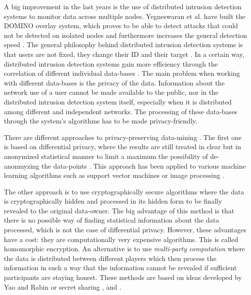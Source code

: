 A big improvement in the last years is the use of distributed intrusion detection systems to monitor data across multiple nodes. Yegneswaran et al. have built the DOMINO overlay system, which proves to be able to detect attacks that could not be detected on isolated nodes and furthermore increases the general detection speed \cite{Yegneswaran2004GlobalSystem}. The general philosophy behind distributed intrusion detection systems is that users are not fixed, they change their ID and their target \cite{Snapp1991DIDSPrototype}. In a certain way, distributed intrusion detection systems gain more efficiency through the correlation of different individual data-bases \cite{RoyceRobbins2004DistributedReview}. The main problem when working with different data-bases is the privacy of the data. Information about the network use of a user cannot be made available to the public, nor in the distributed intrusion detection system itself, especially when it is distributed among different and independent networks. The processing of these data-bases through the system's algorithms has to be made privacy-friendly.

There are different approaches to privacy-preserving data-mining \cite{Narwaria2016PrivacyArt}. The first one is based on differential privacy, where the results are still treated in clear but in anonymized statistical manner to limit a maximum the possibility of de-anonmyzing the data-points \cite{Dwork2008DifferentialResults}. This approach has been applied to various machine learning algorithms such as support vector machines or image processing \cite{Qin2018Privacy-PreservingCloud,Zhan2005Privacy-preservingLearning}.

The other approach is to use cryptographically secure algorithms where the data is cryptographically hidden and processed in its hidden form to be finally revealed to the original data-owner. The big advantage of this method is that there is no possible way of finding statistical information about the data processed, which is not the case of differential privacy. However, these advantages have a cost: they are computationally very expensive algorithms. This is called homomorphic encryption. An alternative is to use \emph{multi-party computation} where the data is distributed between different players which then process the information in such a way that the information cannot be revealed if sufficient participants are staying honest. These methods are based on ideas developed by Yao and Rabin or secret sharing \cite{Yao1986HowSecrets}, \cite{Rabin1981HowTransfer.} and \cite{Shamir1979HowSecret}.

